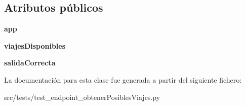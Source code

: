 \subsection*{Atributos públicos}
\begin{DoxyCompactItemize}
\item 
\hypertarget{classsrc_1_1tests_1_1test__endpoint__obtener_posibles_viajes_1_1_test_endpoint_obtener_posibles_viajes_a2b5c770e0a1cf3ecb36ad74f9bdc609a}{{\bfseries app}}\label{classsrc_1_1tests_1_1test__endpoint__obtener_posibles_viajes_1_1_test_endpoint_obtener_posibles_viajes_a2b5c770e0a1cf3ecb36ad74f9bdc609a}

\item 
\hypertarget{classsrc_1_1tests_1_1test__endpoint__obtener_posibles_viajes_1_1_test_endpoint_obtener_posibles_viajes_a861b60d20e96514d0c687c3dd36a09fd}{{\bfseries viajes\-Disponibles}}\label{classsrc_1_1tests_1_1test__endpoint__obtener_posibles_viajes_1_1_test_endpoint_obtener_posibles_viajes_a861b60d20e96514d0c687c3dd36a09fd}

\item 
\hypertarget{classsrc_1_1tests_1_1test__endpoint__obtener_posibles_viajes_1_1_test_endpoint_obtener_posibles_viajes_a289c0da43a33f59ed5440939bb62a850}{{\bfseries salida\-Correcta}}\label{classsrc_1_1tests_1_1test__endpoint__obtener_posibles_viajes_1_1_test_endpoint_obtener_posibles_viajes_a289c0da43a33f59ed5440939bb62a850}

\end{DoxyCompactItemize}


La documentación para esta clase fue generada a partir del siguiente fichero\-:\begin{DoxyCompactItemize}
\item 
src/tests/test\-\_\-endpoint\-\_\-obtener\-Posibles\-Viajes.\-py\end{DoxyCompactItemize}
